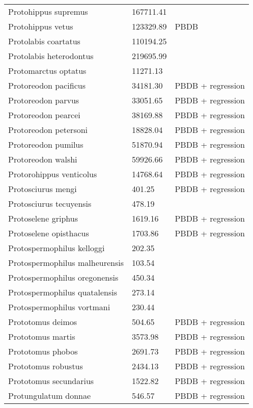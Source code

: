 \begin{center}
\begin{longtable}{p{} p{} p{} }
  Protohippus supremus & 167711.41 & \cite{Tomiya2013} \\ 
  Protohippus vetus & 123329.89 & PBDB \\ 
  Protolabis coartatus & 110194.25 & \cite{Tomiya2013} \\ 
  Protolabis heterodontus & 219695.99 & \cite{Tomiya2013} \\ 
  Protomarctus optatus & 11271.13 & \cite{Tomiya2013} \\ 
  Protoreodon pacificus & 34181.30 & PBDB + regression \\ 
  Protoreodon parvus & 33051.65 & PBDB + regression \\ 
  Protoreodon pearcei & 38169.88 & PBDB + regression \\ 
  Protoreodon petersoni & 18828.04 & PBDB + regression \\ 
  Protoreodon pumilus & 51870.94 & PBDB + regression \\ 
  Protoreodon walshi & 59926.66 & PBDB + regression \\ 
  Protorohippus venticolus & 14768.64 & PBDB + regression \\ 
  Protosciurus mengi & 401.25 & PBDB + regression \\ 
  Protosciurus tecuyensis & 478.19 & \cite{Tomiya2013} \\ 
  Protoselene griphus & 1619.16 & PBDB + regression \\ 
  Protoselene opisthacus & 1703.86 & PBDB + regression \\ 
  Protospermophilus kelloggi & 202.35 & \cite{Tomiya2013} \\ 
  Protospermophilus malheurensis & 103.54 & \cite{Tomiya2013} \\ 
  Protospermophilus oregonensis & 450.34 & \cite{Tomiya2013} \\ 
  Protospermophilus quatalensis & 273.14 & \cite{Tomiya2013} \\ 
  Protospermophilus vortmani & 230.44 & \cite{Tomiya2013} \\ 
  Prototomus deimos & 504.65 & PBDB + regression \\ 
  Prototomus martis & 3573.98 & PBDB + regression \\ 
  Prototomus phobos & 2691.73 & PBDB + regression \\ 
  Prototomus robustus & 2434.13 & PBDB + regression \\ 
  Prototomus secundarius & 1522.82 & PBDB + regression \\ 
  Protungulatum donnae & 546.57 & PBDB + regression \\ 

\end{longtable}
\end{center}
